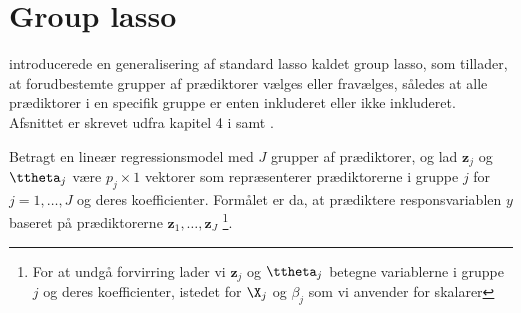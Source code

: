 \section{Group lasso}
\citep{group_lasso} introducerede en generalisering af standard lasso kaldet group lasso, som tillader, at forudbestemte grupper af prædiktorer vælges eller fravælges, således at alle prædiktorer i en specifik gruppe er enten inkluderet eller ikke inkluderet.
Afsnittet er skrevet udfra kapitel 4 i \citep{hastie} samt \citep{group_lasso}.

Betragt en lineær regressionsmodel med $J$ grupper af prædiktorer, og lad $\mathbf{z}_j$ og \(\ttheta_j\) være \(p_j \times 1\) vektorer som repræsenterer prædiktorerne i gruppe $j$ for $j=1, \ldots, J$ og deres koefficienter.
Formålet er da, at prædiktere responsvariablen $y$ baseret på prædiktorerne $\mathbf{z}_1,\ldots, \mathbf{z}_J$ \footnote{For at undgå forvirring lader vi \(\mathbf{z}_j\) og \(\ttheta_j\) betegne variablerne i gruppe \(j\) og deres koefficienter, istedet for \(\X_j\) og \(\beta_j\) som vi anvender for skalarer}.

